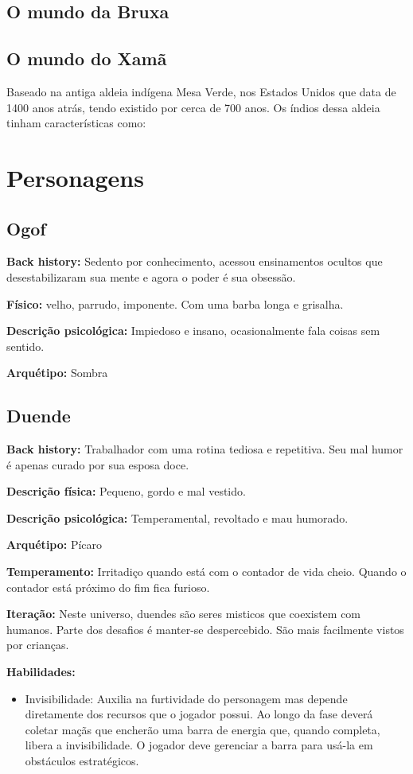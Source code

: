 \subsection{O mundo da Bruxa}
\subsection{O mundo do Xamã}
Baseado na antiga aldeia indígena Mesa Verde, nos Estados Unidos que data de 1400 anos atrás, tendo existido por cerca de 700 anos. Os índios dessa aldeia tinham características como:


\section{Personagens}
\subsection{Ogof}
\textbf{Back history: }Sedento por conhecimento, acessou ensinamentos ocultos que desestabilizaram sua mente e agora o poder é sua obsessão.

\textbf{Físico:} velho, parrudo, imponente. Com uma barba longa e grisalha.

\textbf{Descrição psicológica:} Impiedoso e insano, ocasionalmente fala coisas sem sentido.

\textbf{Arquétipo:} Sombra

\subsection{Duende}
\textbf{Back history:} Trabalhador com uma rotina tediosa e repetitiva. Seu mal humor é apenas curado por sua esposa doce.

\textbf{Descrição física:} Pequeno, gordo e mal vestido.

\textbf{Descrição psicológica:} Temperamental, revoltado e mau humorado.

\textbf{Arquétipo:} Pícaro

\textbf{Temperamento:} Irritadiço quando está com o contador de vida cheio. Quando o contador está próximo do fim fica furioso.

\textbf{Iteração: } Neste universo, duendes são seres misticos que coexistem com humanos. Parte dos desafios é manter-se despercebido. São mais facilmente vistos por crianças.

\textbf{Habilidades: }
\begin{itemize}
\item  Invisibilidade: Auxilia na furtividade do personagem mas depende diretamente dos recursos que o jogador possui. Ao longo da fase deverá coletar maçãs que encherão uma barra de energia que, quando completa, libera a invisibilidade. O jogador deve gerenciar a barra para usá-la em obstáculos estratégicos.
\end{itemize}


